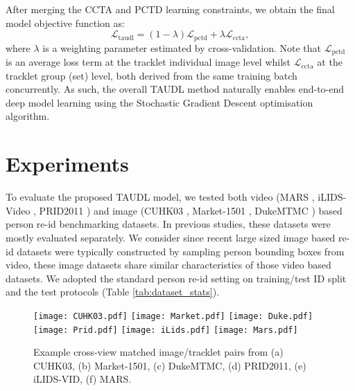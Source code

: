 \documentclass[runningheads]{llncs}
\begin{document}
After merging the CCTA and PCTD learning constraints, we obtain the final 
model objective function as:
\begin{equation}\label{eq:loss_TAUDL}
\mathcal{L}_\text{taudl}= 
(1-\lambda)\mathcal{L}_\text{pctd} + \lambda \mathcal{L}_\text{ccta}, 
\end{equation}
where $\lambda$ is a weighting parameter estimated by cross-validation.
Note that $\mathcal{L}_\text{pctd}$ is an average loss term at the
tracklet individual image level
whilst $\mathcal{L}_\text{ccta}$ at the tracklet group (set) level,
both derived from the same training batch concurrently.
As such, the overall TAUDL method naturally enables end-to-end deep model learning
using the Stochastic Gradient Descent optimisation algorithm.


\section{Experiments}

\noindent {}
To evaluate the proposed TAUDL model, we tested both
video ({MARS} \cite{zheng2016mars}, iLIDS-Video \cite{wang2014person}, PRID2011 \cite{hirzer2011person})
and 
image (CUHK03 \cite{li2014deepreid}, Market-1501
\cite{zheng2015scalable}, DukeMTMC \cite{ristani2016MTMC,zheng2017unlabeled})
based person re-id benchmarking datasets. 
In previous studies, these datasets were mostly evaluated separately.
We consider since recent large sized image based re-id datasets were typically constructed 
by sampling person bounding boxes from video, these image datasets share
similar characteristics of those video based datasets.
We adopted the standard person re-id setting on training/test ID split
and the test protocols (Table \ref{tab:dataset_stats}).


\begin{figure}[t]
\centering
\texttt{[image: CUHK03.pdf]}
\texttt{[image: Market.pdf]}
\texttt{[image: Duke.pdf]}
\texttt{[image: Prid.pdf]}
\texttt{[image: iLids.pdf]}
\texttt{[image: Mars.pdf]}
\caption{Example cross-view matched image/tracklet pairs from 
	(a) CUHK03, (b) Market-1501, (c) DukeMTMC, (d) PRID2011, (e) iLIDS-VID, (f) MARS.
}
\label{fig:dataset_img}
\end{figure}
\end{document}
